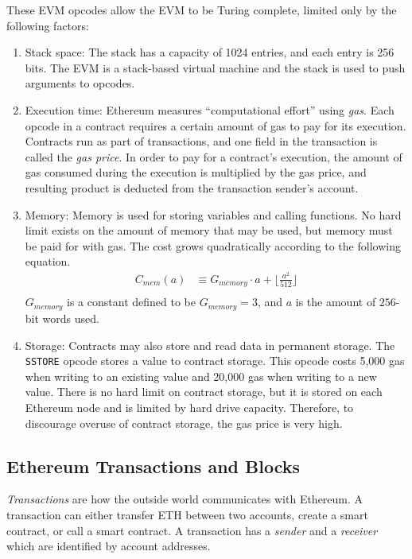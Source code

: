\documentclass[12pt]{article}
\begin{document}
These EVM opcodes allow the EVM to be Turing complete, limited only by the following factors:
\begin{enumerate}
  \item Stack space: The stack has a capacity of 1024 entries, and each entry is 256 bits. The EVM is a stack-based virtual machine and the stack is used to push arguments to opcodes.
  \item Execution time: Ethereum measures ``computational effort'' using \emph{gas}. Each opcode in a contract requires a certain amount of gas to pay for its execution. Contracts run as part of transactions, and one field in the transaction is called the \emph{gas price}. In order to pay for a contract's execution, the amount of gas consumed during the execution is multiplied by the gas price, and resulting product is deducted from the transaction sender's account.
  \item Memory: Memory is used for storing variables and calling functions. No hard limit exists on the amount of memory that may be used, but memory must be paid for with gas. The cost grows quadratically according to the following equation.
  \begin{align*}
    C_{mem}(a) &\equiv G_{memory} \cdot a + \lfloor \frac{a^2}{512} \rfloor \\
  \end{align*}
  $G_{memory}$ is a constant defined to be $G_{memory} = 3$, and $a$ is the amount of $256$-bit words used.
  \item Storage: Contracts may also store and read data in permanent storage. The \texttt{SSTORE} opcode stores a value to contract storage. This opcode costs 5,000 gas when writing to an existing value and 20,000 gas when writing to a new value. There is no hard limit on contract storage, but it is stored on each Ethereum node and is limited by hard drive capacity. Therefore, to discourage overuse of contract storage, the gas price is very high.
\end{enumerate}



\subsection{Ethereum Transactions and Blocks}

\emph{Transactions} are how the outside world communicates with Ethereum. A transaction can either transfer ETH between two accounts, create a smart contract, or call a smart contract. A transaction has a \emph{sender} and a \emph{receiver} which are identified by account addresses.
\end{document}
